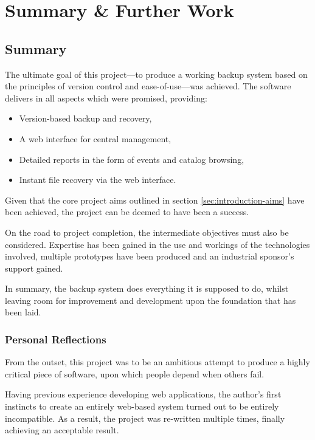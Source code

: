 \chapter{Summary \& Further Work}
\label{chap:summary}

\section{Summary}

The ultimate goal of this project---to produce a working backup system based on
the principles of version control and ease-of-use---was achieved. The software
delivers in all aspects which were promised, providing:

\begin{itemize}
    \item Version-based backup and recovery,
    \item A web interface for central management,
    \item Detailed reports in the form of events and catalog browsing,
    \item Instant file recovery via the web interface.
\end{itemize}

Given that the core project aims outlined in section
\ref{sec:introduction-aims} have been achieved, the project can be deemed to
have been a success.

On the road to project completion, the intermediate objectives must also be
considered. Expertise has been gained in the use and workings of the
technologies involved, multiple prototypes have been produced and an industrial
sponsor's support gained.

In summary, the backup system does everything it is supposed to do, whilst
leaving room for improvement and development upon the foundation that has been
laid.

\subsection{Personal Reflections}

From the outset, this project was to be an ambitious attempt to produce
a highly critical piece of software, upon which people depend when others fail.

Having previous experience developing web applications, the author's first
instincts to create an entirely web-based system turned out to be entirely
incompatible. As a result, the project was re-written multiple times, finally
achieving an acceptable result.

